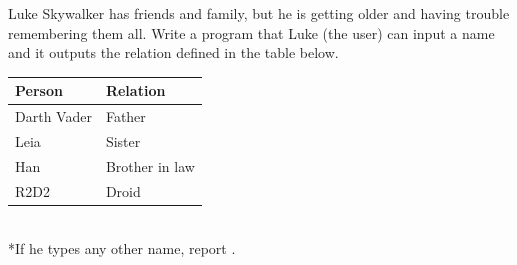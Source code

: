 	\item  
		Luke Skywalker has friends and family, but he is getting older and having trouble 
		remembering them all.  Write a program that Luke (the user) can input a name and it 
		outputs the relation defined in the table below.
		\begin{center}
		\begin{tabular}{|l|l|} \hline
			Person 		& Relation \\ \hline \hline
			Darth Vader	& Father \\ \hline
			Leia		& Sister \\ \hline
			Han			& Brother in law\\ \hline
			R2D2		& Droid \\ \hline
		\end{tabular}\\ \hspace*{1in} *If he types any other name, report .
		\end{center}
		






